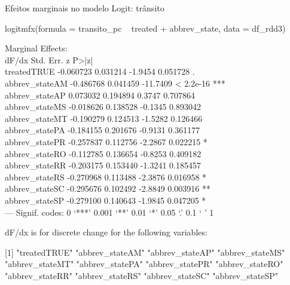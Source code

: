 \documentclass{beamer}
\begin{document}
\begin{frame}{Efeitos marginais no modelo Logit: trânsito}
	\begin{tiny}
logitmfx(formula = transito_pc ~ treated + abbrev_state, data = df_rdd3)

Marginal Effects:\\
dF/dx Std. Err.        z     P>|z|    \\
treatedTRUE    -0.060723  0.031214  -1.9454  0.051728 .  \\
abbrev_stateAM -0.486768  0.041459 -11.7409 < 2.2e-16 ***\\
abbrev_stateAP  0.073032  0.194894   0.3747  0.707864    \\
abbrev_stateMS -0.018626  0.138528  -0.1345  0.893042    \\
abbrev_stateMT -0.190279  0.124513  -1.5282  0.126466    \\
abbrev_statePA -0.184155  0.201676  -0.9131  0.361177    \\
abbrev_statePR -0.257837  0.112756  -2.2867  0.022215 *  \\
abbrev_stateRO -0.112785  0.136654  -0.8253  0.409182    \\
abbrev_stateRR -0.203175  0.153440  -1.3241  0.185457    \\
abbrev_stateRS -0.270968  0.113488  -2.3876  0.016958 *  \\
abbrev_stateSC -0.295676  0.102492  -2.8849  0.003916 ** \\
abbrev_stateSP -0.279100  0.140643  -1.9845  0.047205 *  \\
---
Signif. codes:  0 ‘***’ 0.001 ‘**’ 0.01 ‘*’ 0.05 ‘.’ 0.1 ‘ ’ 1

dF/dx is for discrete change for the following variables:

[1] "treatedTRUE"    "abbrev_stateAM" "abbrev_stateAP" "abbrev_stateMS"\\
[5] "abbrev_stateMT" "abbrev_statePA" "abbrev_statePR" "abbrev_stateRO"\\
[9] "abbrev_stateRR" "abbrev_stateRS" "abbrev_stateSC" "abbrev_stateSP"\\
\end{tiny}
\end{frame}
\end{document}
